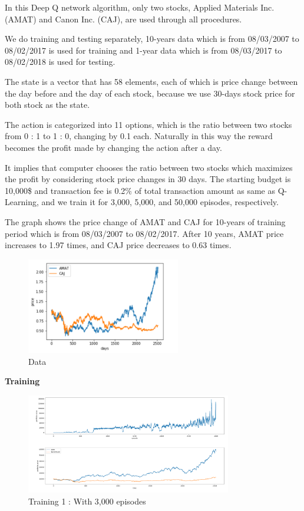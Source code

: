 In this Deep Q network algorithm, only two stocks, Applied Materials Inc. (AMAT) and Canon Inc. (CAJ), are used through all procedures.

We do training and testing separately, 10-years data which is from 08/03/2007 to 08/02/2017 is used for training and 1-year data which is from 08/03/2017 to 08/02/2018 is used for testing.  

The state is a vector that has 58 elements, each of which is price change between the day before and the day of each stock, because we use 30-days stock price for both stock as the state. 

The action is categorized into 11 options, which is the ratio between two stocks from 0 : 1 to 1 : 0, changing by 0.1 each. 
Naturally in this way the reward becomes the profit made by changing the action after a day.

It implies that computer chooses the ratio between two stocks which maximizes the profit by considering stock price changes in 30 days. 
The starting budget is 10,000\$ and transaction fee is 0.2\% of total transaction amount as same as Q-Learning, and we train it for 3,000, 5,000, and 50,000 episodes, respectively.

The graph shows the price change of AMAT and CAJ for 10-years of training period which is from 08/03/2007 to 08/02/2017.
After 10 years, AMAT price increases to 1.97 times, and CAJ price decreases to 0.63 times. 

\begin{figure}[H]
\begin{center}
\includegraphics[clip, width=0.6\textwidth]{Graphics/image3.png} \caption{Data}
\end{center}
\end{figure}

\textbf{Training}

\begin{figure}[H]
\begin{center}
\includegraphics[clip, width=0.8\textwidth]{Graphics/image8.png} \caption{Training 1 : With 3,000 episodes }
\end{center}
\end{figure}

